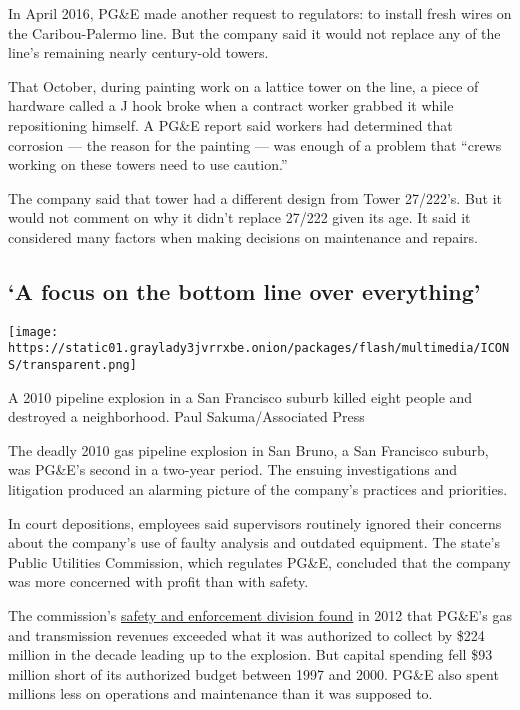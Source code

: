 In April 2016, PG\&E made another request to regulators: to install
fresh wires on the Caribou-Palermo line. But the company said it would
not replace any of the line's remaining nearly century-old towers.

That October, during painting work on a lattice tower on the line, a
piece of hardware called a J hook broke when a contract worker grabbed
it while repositioning himself. A PG\&E report said workers had
determined that corrosion --- the reason for the painting --- was enough
of a problem that ``crews working on these towers need to use caution.''

The company said that tower had a different design from Tower 27/222's.
But it would not comment on why it didn't replace 27/222 given its age.
It said it considered many factors when making decisions on maintenance
and repairs.

\hypertarget{a-focus-on-the-bottom-line-over-everything}{%
\subsection{`A focus on the bottom line over
everything'}\label{a-focus-on-the-bottom-line-over-everything}}

\texttt{[image: https://static01.graylady3jvrrxbe.onion/packages/flash/multimedia/ICONS/transparent.png]}

A 2010 pipeline explosion in a San Francisco suburb killed eight people
and destroyed a neighborhood. Paul Sakuma/Associated Press

The deadly 2010 gas pipeline explosion in San Bruno, a San Francisco
suburb, was PG\&E's second in a two-year period. The ensuing
investigations and litigation produced an alarming picture of the
company's practices and priorities.

In court depositions, employees said supervisors routinely ignored their
concerns about the company's use of faulty analysis and outdated
equipment. The state's Public Utilities Commission, which regulates
PG\&E, concluded that the company was more concerned with profit than
with safety.

The commission's
\href{http://www.cpuc.ca.gov/uploadedFiles/CPUC_Public_Website/Content/Safety/Natural_Gas_Pipeline/News/AgendaStaffReportreOIIPGESanBrunoExplosion.pdf}{safety
and enforcement division found} in 2012 that PG\&E's gas and
transmission revenues exceeded what it was authorized to collect by
\$224 million in the decade leading up to the explosion. But capital
spending fell \$93 million short of its authorized budget between 1997
and 2000. PG\&E also spent millions less on operations and maintenance
than it was supposed to.

